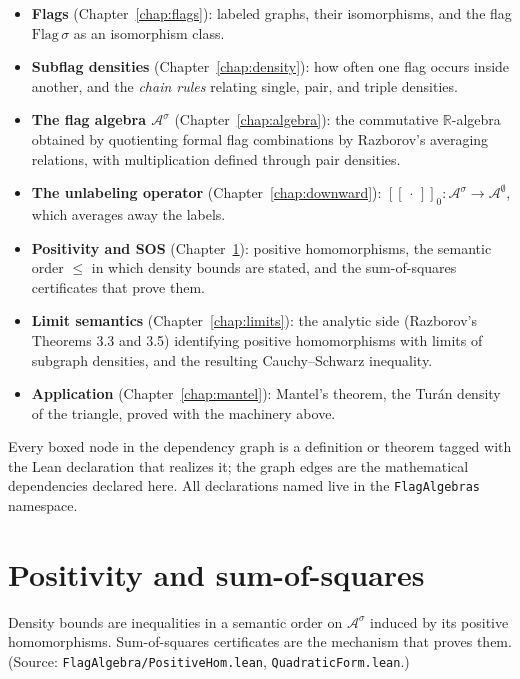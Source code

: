 \begin{itemize}
  \item \textbf{Flags} (Chapter~\ref{chap:flags}): labeled graphs, their
    isomorphisms, and the flag $\mathrm{Flag}\,\sigma$ as an isomorphism class.
  \item \textbf{Subflag densities} (Chapter~\ref{chap:density}): how often one
    flag occurs inside another, and the \emph{chain rules} relating single,
    pair, and triple densities.
  \item \textbf{The flag algebra $\mathcal{A}^\sigma$} (Chapter~\ref{chap:algebra}):
    the commutative $\mathbb{R}$-algebra obtained by quotienting formal flag
    combinations by Razborov's averaging relations, with multiplication defined
    through pair densities.
  \item \textbf{The unlabeling operator} (Chapter~\ref{chap:downward}):
    $[\![\,\cdot\,]\!]_0 : \mathcal{A}^\sigma \to \mathcal{A}^\emptyset$, which
    averages away the labels.
  \item \textbf{Positivity and SOS} (Chapter~\ref{chap:positivity}): positive
    homomorphisms, the semantic order $\le$ in which density bounds are stated,
    and the sum-of-squares certificates that prove them.
  \item \textbf{Limit semantics} (Chapter~\ref{chap:limits}): the analytic side
    (Razborov's Theorems 3.3 and 3.5) identifying positive homomorphisms with
    limits of subgraph densities, and the resulting Cauchy--Schwarz inequality.
  \item \textbf{Application} (Chapter~\ref{chap:mantel}): Mantel's theorem, the
    Tur\'an density of the triangle, proved with the machinery above.
\end{itemize}

Every boxed node in the dependency graph is a definition or theorem tagged with
the Lean declaration that realizes it; the graph edges are the mathematical
dependencies declared here. All declarations named live in the \texttt{FlagAlgebras}
namespace.


\chapter{Positivity and sum-of-squares}
\label{chap:positivity}

Density bounds are inequalities in a semantic order on $\mathcal{A}^\sigma$
induced by its positive homomorphisms. Sum-of-squares certificates are the
mechanism that proves them. (Source: \texttt{FlagAlgebra/PositiveHom.lean},
\texttt{QuadraticForm.lean}.)

